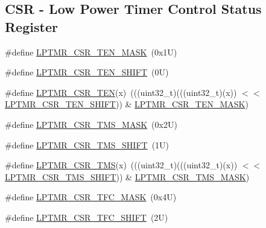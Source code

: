 \subsection*{C\+SR -\/ Low Power Timer Control Status Register}
\begin{DoxyCompactItemize}
\item 
\#define \mbox{\hyperlink{group___l_p_t_m_r___register___masks_ga4ed197f1cb8d0e954324b4854ff14a83}{L\+P\+T\+M\+R\+\_\+\+C\+S\+R\+\_\+\+T\+E\+N\+\_\+\+M\+A\+SK}}~(0x1\+U)
\item 
\#define \mbox{\hyperlink{group___l_p_t_m_r___register___masks_gada00f24f79b11a91e8404b4531d66733}{L\+P\+T\+M\+R\+\_\+\+C\+S\+R\+\_\+\+T\+E\+N\+\_\+\+S\+H\+I\+FT}}~(0\+U)
\item 
\#define \mbox{\hyperlink{group___l_p_t_m_r___register___masks_gae18358081bf10e96a1307612264a31fd}{L\+P\+T\+M\+R\+\_\+\+C\+S\+R\+\_\+\+T\+EN}}(x)~(((uint32\+\_\+t)(((uint32\+\_\+t)(x)) $<$$<$ \mbox{\hyperlink{group___l_p_t_m_r___register___masks_gada00f24f79b11a91e8404b4531d66733}{L\+P\+T\+M\+R\+\_\+\+C\+S\+R\+\_\+\+T\+E\+N\+\_\+\+S\+H\+I\+FT}})) \& \mbox{\hyperlink{group___l_p_t_m_r___register___masks_ga4ed197f1cb8d0e954324b4854ff14a83}{L\+P\+T\+M\+R\+\_\+\+C\+S\+R\+\_\+\+T\+E\+N\+\_\+\+M\+A\+SK}})
\item 
\#define \mbox{\hyperlink{group___l_p_t_m_r___register___masks_ga57ee593a57d844d7bb4b87c127765558}{L\+P\+T\+M\+R\+\_\+\+C\+S\+R\+\_\+\+T\+M\+S\+\_\+\+M\+A\+SK}}~(0x2\+U)
\item 
\#define \mbox{\hyperlink{group___l_p_t_m_r___register___masks_gaeac406c6a48e15c6ec5784fb891b51b6}{L\+P\+T\+M\+R\+\_\+\+C\+S\+R\+\_\+\+T\+M\+S\+\_\+\+S\+H\+I\+FT}}~(1\+U)
\item 
\#define \mbox{\hyperlink{group___l_p_t_m_r___register___masks_gae8af700b27a8e6aad5c035eb9181766c}{L\+P\+T\+M\+R\+\_\+\+C\+S\+R\+\_\+\+T\+MS}}(x)~(((uint32\+\_\+t)(((uint32\+\_\+t)(x)) $<$$<$ \mbox{\hyperlink{group___l_p_t_m_r___register___masks_gaeac406c6a48e15c6ec5784fb891b51b6}{L\+P\+T\+M\+R\+\_\+\+C\+S\+R\+\_\+\+T\+M\+S\+\_\+\+S\+H\+I\+FT}})) \& \mbox{\hyperlink{group___l_p_t_m_r___register___masks_ga57ee593a57d844d7bb4b87c127765558}{L\+P\+T\+M\+R\+\_\+\+C\+S\+R\+\_\+\+T\+M\+S\+\_\+\+M\+A\+SK}})
\item 
\#define \mbox{\hyperlink{group___l_p_t_m_r___register___masks_gaca581598c0f319b0002deda730479842}{L\+P\+T\+M\+R\+\_\+\+C\+S\+R\+\_\+\+T\+F\+C\+\_\+\+M\+A\+SK}}~(0x4\+U)
\item 
\#define \mbox{\hyperlink{group___l_p_t_m_r___register___masks_gaee3d1b59f30f6217f1f74b18cf973c4a}{L\+P\+T\+M\+R\+\_\+\+C\+S\+R\+\_\+\+T\+F\+C\+\_\+\+S\+H\+I\+FT}}~(2\+U)

\end{DoxyCompactItemize}

